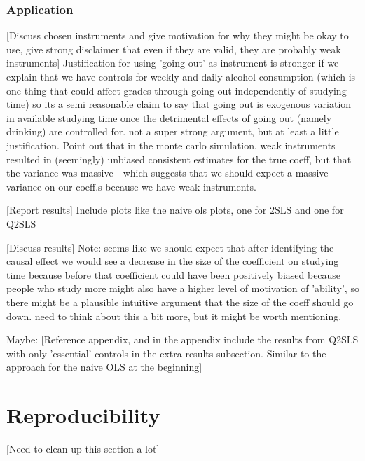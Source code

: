 \documentclass[12pt]{article}
\begin{document}
\subsubsection{Application}
\textcolor{BrickRed}{[Discuss chosen instruments and give motivation for why they might be okay to use, give strong disclaimer that even if they are valid, they are probably weak instruments]} Justification for using 'going out' as instrument is stronger if we explain that we have controls for weekly and daily alcohol consumption (which is one thing that could affect grades through going out independently of studying time) so its a semi reasonable claim to say that going out is exogenous variation in available studying time once the detrimental effects of going out (namely drinking) are controlled for. not a super strong argument, but at least a little justification. Point out that in the monte carlo simulation, weak instruments resulted in (seemingly) unbiased consistent estimates for the true coeff, but that the variance was massive - which suggests that we should expect a massive variance on our coeff.s because we have weak instruments.

\textcolor{BrickRed}{[Report results]} Include plots like the naive ols plots, one for 2SLS and one for Q2SLS

\textcolor{BrickRed}{[Discuss results]} Note: seems like we should expect that after identifying the causal effect we would see a decrease in the size of the coefficient on studying time because before that coefficient could have been positively biased because people who study more might also have a higher level of motivation of 'ability', so there might be a plausible intuitive argument that the size of the coeff should go down. need to think about this a bit more, but it might be worth mentioning.

Maybe: \textcolor{BrickRed}{[Reference appendix, and in the appendix include the results from Q2SLS with only 'essential' controls in the extra results subsection. Similar to the approach for the naive OLS at the beginning]}


\newpage
\section{Reproducibility}
\textcolor{BrickRed}{[Need to clean up this section a lot]}
\end{document}
